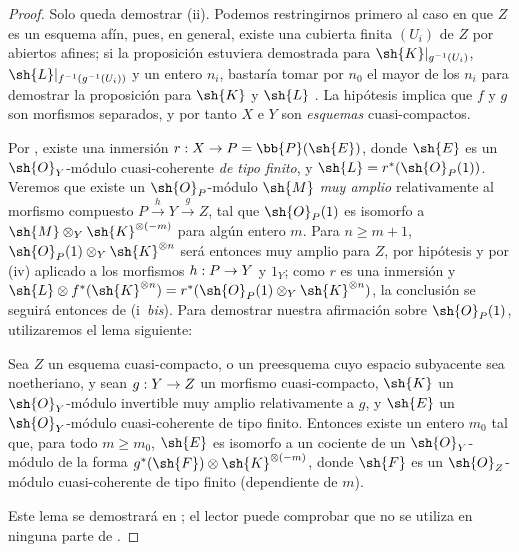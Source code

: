 \documentclass[oneside,10pt]{amsart}
\makeatletter
\renewcommand{\geq}{\geqslant}
\newcommand{\ega@arrow}[2]{\mathchoice{#1}{#2}{#2}{#2}}
\renewcommand{\to}{\ega@arrow{\longrightarrow}{\rightarrow}}
\let\EGAOriginalLabel\label
\renewcommand{\label}[1]{\phantomsection\EGAOriginalLabel{#1}}
\makeatother
\begin{document}
\begin{proof}
Solo queda demostrar (ii).
Podemos restringirnos primero al caso en que $Z$ es un esquema afín, pues, en general, existe una cubierta finita $(U_i)$ de $Z$ por abiertos afines;
si la proposición estuviera demostrada para $\sh{K}|_{g^{-1}(U_i)}$, $\sh{L}|_{f^{-1}(g^{-1}(U_i))}$ y un entero $n_i$, bastaría tomar por $n_0$ el mayor de los $n_i$ para demostrar la proposición para $\sh{K}$ y $\sh{L}$ .
La hipótesis implica que $f$ y $g$ son morfismos separados, y por tanto $X$ e $Y$ son \emph{esquemas} cuasi-compactos.

Por , existe una inmersión $r:X\to P=\bb{P}(\sh{E})$, donde $\sh{E}$ es un $\sh{O}_Y$-módulo cuasi-coherente \emph{de tipo finito}, y $\sh{L}=r^*(\sh{O}_P(1))$.
Veremos que existe un $\sh{O}_P$-módulo $\sh{M}$ \emph{muy amplio} relativamente al morfismo compuesto $P\xrightarrow{h}Y\xrightarrow{g}Z$, tal que $\sh{O}_P(1)$ es isomorfo a $\sh{M}\otimes_Y\sh{K}^{\otimes(-m)}$ para algún entero $m$.
Para $n\geq m+1$, $\sh{O}_P(1)\otimes_Y\sh{K}^{\otimes n}$ será entonces muy amplio para $Z$, por hipótesis y por (iv) aplicado a los morfismos $h:P\to Y$ y $1_Y$;
como $r$ es una inmersión y $\sh{L}\otimes f^*(\sh{K}^{\otimes n})=r^*(\sh{O}_P(1)\otimes_Y\sh{K}^{\otimes n})$, la conclusión se seguirá entonces de (i~\emph{bis}).
Para demostrar nuestra afirmación sobre $\sh{O}_P(1)$, utilizaremos el lema siguiente:

\begin{lemma}[4.4.10.1]
\label{II.4.4.10.1}
Sea $Z$ un esquema cuasi-compacto, o un preesquema cuyo espacio subyacente sea noetheriano, y sean $g:Y\to Z$ un morfismo cuasi-compacto, $\sh{K}$ un $\sh{O}_Y$-módulo invertible muy amplio relativamente a $g$, y $\sh{E}$ un $\sh{O}_Y$-módulo cuasi-coherente de tipo finito.
Entonces existe un entero $m_0$ tal que, para todo $m\geq m_0$, $\sh{E}$ es isomorfo a un cociente de un $\sh{O}_Y$-módulo de la forma $g^*(\sh{F})\otimes\sh{K}^{\otimes(-m)}$, donde $\sh{F}$ es un $\sh{O}_Z$-módulo cuasi-coherente de tipo finito (dependiente de $m$).
\end{lemma}

Este lema se demostrará en ;
el lector puede comprobar que  no se utiliza en ninguna parte de .


\end{proof}
\end{document}
